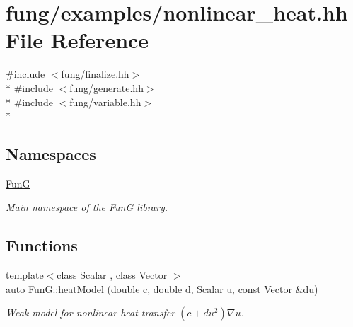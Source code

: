 \hypertarget{nonlinear__heat_8hh}{\section{fung/examples/nonlinear\-\_\-heat.hh File Reference}
\label{nonlinear__heat_8hh}
}
{\ttfamily \#include $<$fung/finalize.\-hh$>$}\\*
{\ttfamily \#include $<$fung/generate.\-hh$>$}\\*
{\ttfamily \#include $<$fung/variable.\-hh$>$}\\*
\subsection*{Namespaces}
\begin{DoxyCompactItemize}
\item 
\hyperlink{namespaceFunG}{Fun\-G}
\begin{DoxyCompactList}\small\item\em Main namespace of the Fun\-G library. \end{DoxyCompactList}\end{DoxyCompactItemize}
\subsection*{Functions}
\begin{DoxyCompactItemize}
\item 
{\footnotesize template$<$class Scalar , class Vector $>$ }\\auto \hyperlink{namespaceFunG_aab17a1468e61f58564333b3fcd7900d6}{Fun\-G\-::heat\-Model} (double c, double d, Scalar u, const Vector \&du)
\begin{DoxyCompactList}\small\item\em Weak model for nonlinear heat transfer $ (c+du^2)\nabla u $. \end{DoxyCompactList}\end{DoxyCompactItemize}
